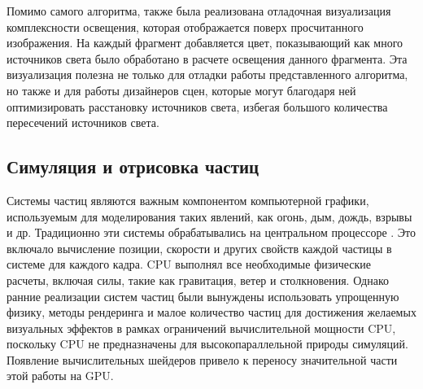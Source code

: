 Помимо самого алгоритма, также была реализована отладочная визуализация комплексности освещения, которая отображается поверх просчитанного изображения. На каждый фрагмент добавляется цвет, показывающий как много источников света было обработано в расчете освещения данного фрагмента. Эта визуализация полезна не только для отладки работы представленного алгоритма, но также и для работы дизайнеров сцен, которые могут благодаря ней оптимизировать расстановку источников света, избегая большого количества пересечений источников света.

\subsection{Симуляция и отрисовка частиц}
Системы частиц являются важным компонентом компьютерной графики, используемым для моделирования таких явлений, как огонь, дым, дождь, взрывы и др. Традиционно эти системы обрабатывались на центральном процессоре \cite{lucasfilm_particle_systems_1983}. Это включало вычисление позиции, скорости и других свойств каждой частицы в системе для каждого кадра. CPU выполнял все необходимые физические расчеты, включая силы, такие как гравитация, ветер и столкновения. Однако ранние реализации систем частиц были вынуждены использовать упрощенную физику, методы рендеринга и малое количество частиц для достижения желаемых визуальных эффектов в рамках ограничений вычислительной мощности CPU, поскольку CPU не предназначены для высокопараллельной природы симуляций. Появление вычислительных шейдеров привело к переносу значительной части этой работы на GPU.

